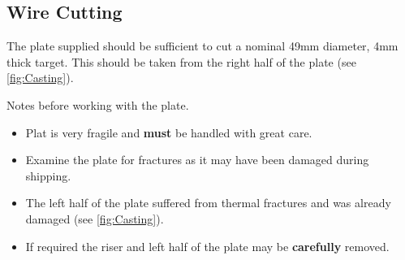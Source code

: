 \subsection{Wire Cutting}
The plate supplied should be sufficient to cut a nominal 49mm diameter, 4mm thick target. This should be taken from the right half of the plate (see \ref{fig:Casting}). 

Notes before working with the plate.
\begin{itemize}
\item Plat is very fragile and \textbf{must} be handled with great care. 
\item Examine the plate for fractures as it may have been damaged during shipping. 
\item The left half of the plate suffered from thermal fractures and was already damaged (see \ref{fig:Casting}). 
\item If required the riser and left half of the plate may be \textbf{carefully} removed.
\end{itemize}